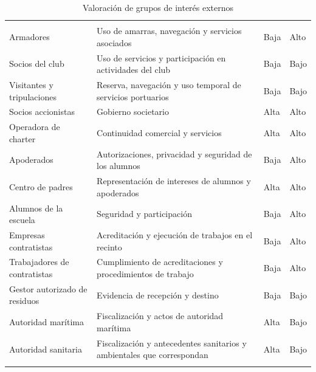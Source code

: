 \begin{longtable}{@{}L{.34\textwidth}L{.34\textwidth}L{.16\textwidth}L{\dimexpr.16\textwidth-18pt\relax}@{}}
    \caption{Valoración de grupos de interés externos}
    \label{tab:actores_externos}\\
    \hline
     &  &  &  \\
    \hline
    \endfirsthead
    \hline
     &  &  &  \\
    \hline
    \endhead
Armadores & Uso de amarras, navegación y servicios asociados & Baja & Alto \\ \addlinespace \hline
Socios del club & Uso de servicios y participación en actividades del club & Baja & Bajo \\ \addlinespace \hline
Visitantes y tripulaciones & Reserva, navegación y uso temporal de servicios portuarios & Baja & Bajo \\ \addlinespace \hline
Socios accionistas & Gobierno societario & Alta & Alto \\ \addlinespace \hline
Operadora de charter & Continuidad comercial y servicios & Alta & Alto \\ \addlinespace \hline
Apoderados & Autorizaciones, privacidad y seguridad de los alumnos & Baja & Alto \\ \addlinespace \hline
Centro de padres & Representación de intereses de alumnos y apoderados & Alta & Alto \\ \addlinespace \hline
Alumnos de la escuela & Seguridad y participación & Baja & Alto \\ \addlinespace \hline
Empresas contratistas & Acreditación y ejecución de trabajos en el recinto & Baja & Alto \\ \addlinespace \hline
Trabajadores de contratistas & Cumplimiento de acreditaciones y procedimientos de trabajo & Baja & Alto \\ \addlinespace \hline
Gestor autorizado de residuos & Evidencia de recepción y destino & Baja & Bajo \\ \addlinespace \hline
Autoridad marítima & Fiscalización y actos de autoridad marítima & Alta & Bajo \\ \addlinespace \hline
Autoridad sanitaria & Fiscalización y antecedentes sanitarios y ambientales que correspondan & Alta & Bajo \\ \addlinespace \hline

\end{longtable}
